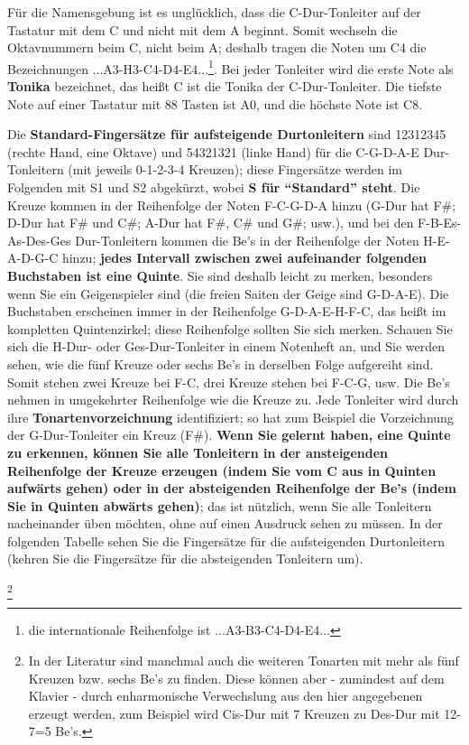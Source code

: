 Für die Namensgebung ist es unglücklich, dass die C-Dur-Tonleiter auf der Tastatur mit dem C und nicht mit dem A beginnt.
Somit wechseln die Oktavnummern beim C, nicht beim A; deshalb tragen die Noten um C4 die Bezeichnungen ...A3-H3-C4-D4-E4...\footnote{die internationale Reihenfolge ist ...A3-B3-C4-D4-E4...}.
Bei jeder Tonleiter wird die erste Note als \textbf{Tonika} bezeichnet, das heißt C ist die Tonika der C-Dur-Tonleiter.
Die tiefste Note auf einer Tastatur mit 88 Tasten ist A0, und die höchste Note ist C8.


\label{table}

Die \textbf{Standard-Fingersätze für aufsteigende Durtonleitern} sind 12312345 (rechte Hand, eine Oktave) und 54321321 (linke Hand) für die C-G-D-A-E Dur-Tonleitern (mit jeweils 0-1-2-3-4 Kreuzen); diese Fingersätze werden im Folgenden mit S1 und S2 abgekürzt, wobei \textbf{S für \enquote{Standard} steht}.
Die Kreuze kommen in der Reihenfolge der Noten F-C-G-D-A hinzu (G-Dur hat F\#; D-Dur hat F\# und C\#; A-Dur hat F\#, C\# und G\#; usw.), und bei den F-B-Es-As-Des-Ges Dur-Tonleitern kommen die Be's in der Reihenfolge der Noten H-E-A-D-G-C hinzu; \textbf{jedes Intervall zwischen zwei aufeinander folgenden Buchstaben ist eine Quinte}.
Sie sind deshalb leicht zu merken, besonders wenn Sie ein Geigenspieler sind (die freien Saiten der Geige sind G-D-A-E).
Die Buchstaben erscheinen immer in der Reihenfolge G-D-A-E-H-F-C, das heißt im kompletten Quintenzirkel; diese Reihenfolge sollten Sie sich merken.
Schauen Sie sich die H-Dur- oder Ges-Dur-Tonleiter in einem Notenheft an, und Sie werden sehen, wie die fünf Kreuze oder sechs Be's in derselben Folge aufgereiht sind.
Somit stehen zwei Kreuze bei F-C, drei Kreuze stehen bei F-C-G, usw.
Die Be's nehmen in umgekehrter Reihenfolge wie die Kreuze zu.
Jede Tonleiter wird durch ihre \textbf{Tonartenvorzeichnung} identifiziert; so hat zum Beispiel die Vorzeichnung der G-Dur-Tonleiter ein Kreuz (F\#).
\textbf{Wenn Sie gelernt haben, eine Quinte zu erkennen, können Sie alle Tonleitern in der ansteigenden Reihenfolge der Kreuze erzeugen (indem Sie vom C aus in Quinten aufwärts gehen) oder in der absteigenden Reihenfolge der Be's (indem Sie in Quinten abwärts gehen)}; das ist nützlich, wenn Sie alle Tonleitern nacheinander üben möchten, ohne auf einen Ausdruck sehen zu müssen.
In der folgenden Tabelle sehen Sie die Fingersätze für die aufsteigenden Durtonleitern (kehren Sie die Fingersätze für die absteigenden Tonleitern um).

\label{enharmonisch}\footnote{In der Literatur sind manchmal auch die weiteren Tonarten mit mehr als fünf Kreuzen bzw. sechs Be's zu finden.
Diese können aber - zumindest auf dem Klavier - durch enharmonische Verwechslung aus den hier angegebenen erzeugt werden, zum Beispiel wird Cis-Dur mit 7 Kreuzen zu Des-Dur mit 12-7=5 Be's.}

